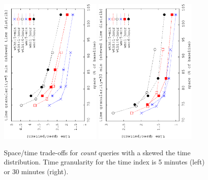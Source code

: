 	\begin{figure}[ht]
		\begin{center}
			\includegraphics[angle=-90,width=0.45\textwidth]{figures_synt/skewed5m.eps}
			\includegraphics[angle=-90,width=0.45\textwidth]{figures_synt/skewed30m.eps}
			\caption{Space/time trade-offs for {\em count} queries with a skewed the time distribution.
				Time granularity for the time index is 5 minutes (left) or 30 minutes (right).
			}
			\label{fig:ctr:exp:queries:wt:skewed}
		\end{center}
	\end{figure}
	
